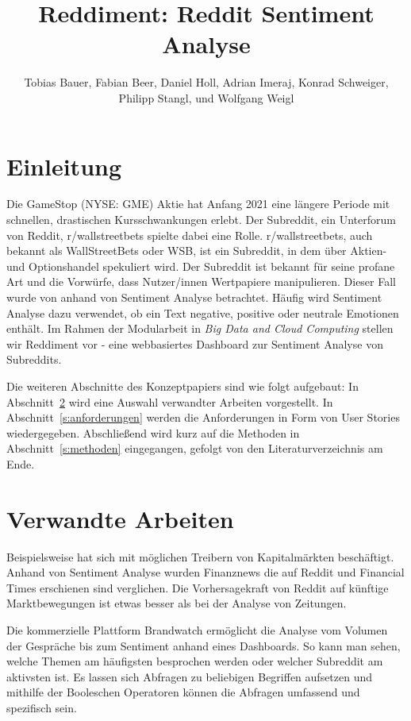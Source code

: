 \documentclass[a4paper, 10pt, conference]{ieeeconf}
\title{\LARGE \bf
Reddiment: Reddit Sentiment Analyse
}
\author{Tobias Bauer, Fabian Beer,  Daniel Holl,  Adrian Imeraj,  Konrad Schweiger,  Philipp Stangl, und Wolfgang Weigl
}
\begin{document}
\maketitle
\thispagestyle{empty}
\pagestyle{empty}

\section{Einleitung}

Die GameStop (NYSE: GME) Aktie hat Anfang 2021 eine längere Periode mit schnellen, drastischen Kursschwankungen erlebt. Der Subreddit,  ein Unterforum von Reddit,  r/wallstreetbets spielte dabei eine Rolle. r/wallstreetbets, auch bekannt als WallStreetBets oder WSB, ist ein Subreddit, in dem über Aktien- und Optionshandel spekuliert wird.  Der Subreddit ist bekannt für seine profane Art und die Vorwürfe, dass Nutzer/innen Wertpapiere manipulieren. Dieser Fall wurde von \citeauthor{wang2021} \cite{wang2021} anhand von Sentiment Analyse betrachtet. Häufig wird Sentiment Analyse dazu verwendet, ob ein Text negative, positive oder neutrale Emotionen enthält. Im Rahmen der Modularbeit in \textit{Big Data and Cloud Computing} stellen wir Reddiment vor - eine webbasiertes Dashboard zur Sentiment Analyse von Subreddits.  

Die weiteren Abschnitte des Konzeptpapiers sind wie folgt aufgebaut: In Abschnitt~\ref{s:verwandte_arbeiten} wird eine Auswahl verwandter Arbeiten vorgestellt.  In Abschnitt~\ref{s:anforderungen} werden die Anforderungen in Form von User Stories wiedergegeben.  Abschließend wird kurz auf die Methoden in Abschnitt~\ref{s:methoden} eingegangen, gefolgt von den Literaturverzeichnis am Ende. 

\section{Verwandte Arbeiten} \label{s:verwandte_arbeiten}

Beispielsweise hat sich \citeauthor{lubitz2017} \cite{lubitz2017} mit möglichen Treibern von Kapitalmärkten beschäftigt. Anhand von Sentiment Analyse wurden Finanznews die auf Reddit und Financial Times erschienen sind verglichen.  Die Vorhersagekraft von Reddit auf künftige Marktbewegungen ist etwas besser als bei der Analyse von Zeitungen. 

Die kommerzielle Plattform Brandwatch \cite{brandwatch} ermöglicht die Analyse vom Volumen der Gespräche bis zum Sentiment anhand eines Dashboards. So kann man sehen, welche Themen am häufigsten besprochen werden oder welcher Subreddit am aktivsten ist. Es lassen sich Abfragen zu beliebigen Begriffen aufsetzen und mithilfe der Booleschen Operatoren können die Abfragen umfassend und spezifisch sein. 
\end{document}
